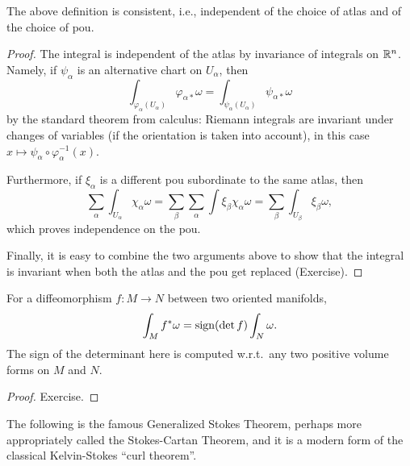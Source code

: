 \begin{prop}
    The above definition is consistent, i.e., independent of the choice of atlas and of the choice of \gls{pou}.
\end{prop}
\begin{proof}
    The integral is independent of the atlas by invariance of integrals on $\mathbb{R}^n$. Namely, if $\psi_\alpha$ is an alternative chart on $U_\alpha$, then
    \[\int_{\varphi_\alpha(U_\alpha)}\varphi_{\alpha\ast}\omega=\int_{\psi_\alpha(U_\alpha)}\psi_{\alpha\ast}\omega\]
    by the standard theorem from calculus: Riemann integrals are invariant under changes of variables (if the orientation is taken into account), in this case $x\mapsto \psi_\alpha\circ\varphi_\alpha^{-1}(x)$.

    Furthermore, if $\xi_\alpha$ is a different \gls{pou} subordinate to the same atlas, then
    \[\sum_\alpha\int_{U_\alpha}\chi_\alpha\omega=\sum_\beta\sum_\alpha\int \xi_\beta\chi_\alpha\omega=\sum_\beta\int_{U_\beta}\xi_\beta\omega,\]
    which proves independence on the \gls{pou}.

    Finally, it is easy to combine the two arguments above to show that the integral is invariant when both the atlas and the \gls{pou} get replaced (Exercise).
\end{proof}


\begin{prop}
    For a diffeomorphism $f:M\to N$ between two oriented manifolds,
    \[\int_M f^\ast \omega=\operatorname{sign}(\det f) \int_N \omega.\]
    The sign of the determinant here is computed w.r.t.\ any two positive volume forms on $M$ and $N$.
\end{prop}
\begin{proof}
Exercise.
\end{proof}

The following is the famous Generalized Stokes Theorem, perhaps more appropriately called the Stokes-Cartan Theorem, and it is a modern form of the classical Kelvin-Stokes ``curl theorem''.

